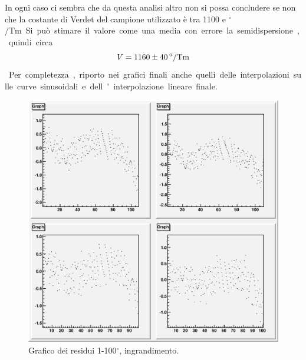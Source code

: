 \documentclass[italian,a4paper]{article}
\begin{document}
In ogni caso ci sembra che da questa analisi altro non si possa
concludere se non che la costante di Verdet del campione utilizzato è tra
1100 e \unit[1200]{$^\circ$/Tm}. Si può stimare il valore come una media con
errore la semidispersione, quindi circa
\begin{equation*}
    V = \unit[1160\pm40]{^\circ/Tm}
\end{equation*}

Per completezza, riporto nei grafici finali anche quelli delle
interpolazioni sulle curve sinusoidali e dell'interpolazione lineare finale.
\begin{figure}[h]
    \begin{center}
        \includegraphics[height=0.4\textheight, width=.9\textwidth]{grafici/1-100r.big.eps}
    \end{center}
    \caption{Grafico dei residui 1-100$^\circ$, ingrandimento.}
    \label{fig:1100rbig}
\end{figure}
\end{document}
